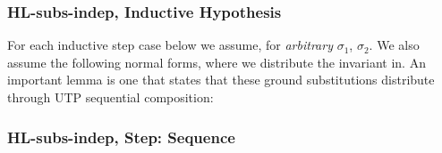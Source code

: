 \newpage
\subsubsection{\textsf{HL-subs-indep}, Inductive Hypothesis}

For each inductive step case below we assume,
for \emph{arbitrary} $\sigma_1$, $\sigma_2$.
We also assume the following normal forms,
where we distribute the invariant in.
An important lemma is one that states that these ground substitutions
distribute through UTP sequential composition:

\subsubsection{\textsf{HL-subs-indep}, Step: Sequence}

